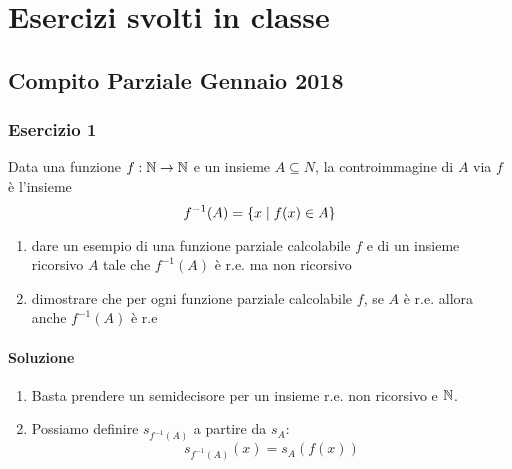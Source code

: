%
%
%
%
\chapter{Esercizi svolti in classe}

\section{Compito Parziale Gennaio 2018}

\subsection{Esercizio 1}

Data una funzione $f:\mathbb{N} \to \mathbb{N}$ e un insieme $A \subseteq N$, la controimmagine di $A$ via $f$ è l’insieme
\begin{equation*}
    f^{-1}(A) = \{x \mid f(x) \in A\}
\end{equation*}
\begin{enumerate}[label=(\alph*) ]
    \item dare un esempio di una funzione parziale calcolabile $f$ e di un insieme ricorsivo $A$
    tale che $f^{-1}(A)$ è r.e.  ma non ricorsivo
    \item dimostrare che per ogni funzione parziale calcolabile $f$, se $A$ è r.e. allora anche
    $f^{-1}(A)$ è r.e
\end{enumerate}

\subsubsection{Soluzione}

\begin{enumerate}[label=(\alph*) ]
    \item Basta prendere un semidecisore per un insieme r.e. non ricorsivo e $\mathbb{N}$. 
    \item Possiamo definire $s_{f^{-1}(A)}$ a partire da $s_{A}$:
    \begin{equation*}
        s_{f^{-1}(A)}(x) = s_{A}(f(x))
    \end{equation*}
\end{enumerate}

